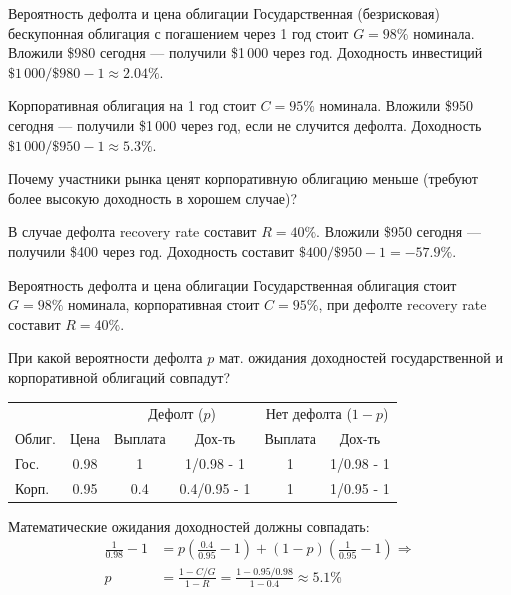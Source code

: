 \documentclass{beamer}
\begin{document}
\begin{frame}{Вероятность дефолта и цена облигации}
\justify
Государственная (безрисковая) бескупонная облигация с погашением через 1 год стоит $G=98\%$ номинала. Вложили \$980 сегодня --- получили \$1\,000 через год. Доходность инвестиций $\$1\,000 / \$980 - 1 \approx 2.04\%$.

\justify
Корпоративная облигация на 1 год стоит $C=95\%$ номинала. Вложили \$950 сегодня --- получили \$1\,000 через год, если не случится дефолта. Доходность $\$1\,000 / \$950 - 1 \approx 5.3\%$.

\justify
Почему участники рынка ценят корпоративную облигацию меньше (требуют более высокую доходность в хорошем случае)?

\justify
В случае дефолта recovery rate составит $R=40\%$. Вложили \$950 сегодня --- получили \$400 через год. Доходность составит $\$400 / \$950 - 1 = -57.9\%$.
\end{frame}



\begin{frame}{Вероятность дефолта и цена облигации}
\justify
Государственная облигация стоит $G=98\%$ номинала, корпоративная стоит $C=95\%$, при дефолте recovery rate составит $R=40\%$.

\justify
При какой вероятности дефолта $p$ мат. ожидания доходностей государственной и корпоративной облигаций совпадут?

\centering
\begin{tabular}{l|c|c|c|c|c}
& & \multicolumn{2}{c|}{Дефолт ($p$)} & \multicolumn{2}{c}{Нет дефолта ($1-p$)} \\
Облиг. & Цена & Выплата & Дох-ть & Выплата & Дох-ть \\
\hline
Гос.  & 0.98 & 1     & 1/0.98 - 1 & 1 & 1/0.98 - 1\\
Корп. & 0.95 & 0.4 & 0.4/0.95 - 1 & 1 & 1/0.95 - 1
\end{tabular}

\justify
Математические ожидания доходностей должны совпадать:
\begin{align*}
\frac{1}{0.98} - 1 &= p\left(\frac{0.4}{0.95} - 1\right) + (1-p)\left(\frac{1}{0.95} - 1\right) \Rightarrow \\
p &= \frac{1 - C/G}{1-R} = \frac{1 - 0.95/0.98}{1-0.4} \approx 5.1\%
\end{align*}
\end{frame}
\end{document}
